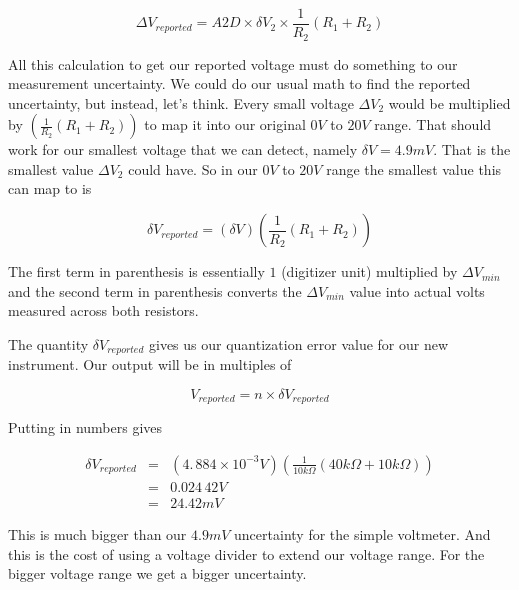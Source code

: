 \begin{equation*}
	\Delta V_{reported}=A2D\times \delta V_{2}\times \frac{1}{R_{2}}\left(R_{1}+R_{2}\right)
\end{equation*}

All this calculation to get our reported voltage must do something to our measurement uncertainty. We could do our usual math to find the reported uncertainty, but instead, let's think. Every small voltage $\Delta V_{2}$ would be multiplied by $\left( \frac{1}{R_{2}}\left( R_{1}+R_{2}\right) \right) $ to map it into our original $0\unit{V}$ to $20\unit{V}$ range. That should work for our smallest voltage that we can detect, namely $\delta V=4.9\unit{mV}.$ That is the smallest value $\Delta V_{2}$ could have. So in our $0\unit{V}$ to $20\unit{V}$ range the smallest value this can map to is  

\begin{equation*}
	\delta V_{reported}=\left( \delta V\right) \left( \frac{1}{R_{2}}\left(R_{1}+R_{2}\right) \right)
\end{equation*}

The first term in parenthesis is essentially $1$ (digitizer unit) multiplied by $\Delta V_{min}$ and the second term in parenthesis converts the $\Delta V_{min}$ value into actual volts measured across both resistors.

The quantity $\delta V_{reported}$ gives us our quantization error value for our new instrument. Our output will be in multiples of 

\begin{equation*}
	V_{reported}=n\times \delta V_{reported}
\end{equation*}

\noindent Putting in numbers gives 

\begin{eqnarray*}
	\delta V_{reported} &=&\left( 4.\,\allowbreak 884\times 10^{-3}\unit{V} \right) \left( \frac{1}{10\unit{k\Omega}}\left( 40\unit{k\Omega}+10\unit{k\Omega}\right) \right) \\
                        &=&0.024\,42\unit{V} \\
                        &=&24.42\unit{mV}
\end{eqnarray*}

This is much bigger than our $4.9\unit{mV}$ uncertainty for the simple voltmeter. And this is the cost of using a voltage divider to extend our voltage range. For the bigger voltage range we get a bigger uncertainty.

